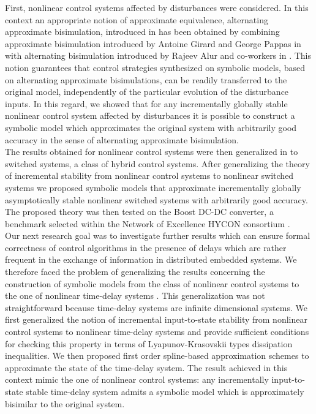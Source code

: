 \documentclass[submission,copyright,creativecommons]{eptcs}
\begin{document}
First, nonlinear control systems affected by disturbances were considered. In this context an appropriate notion of approximate equivalence, alternating approximate bisimulation, introduced in \cite{PolaSIAM2009} has been obtained by combining approximate bisimulation introduced by Antoine Girard and George Pappas in \cite{AB-TAC07} with alternating bisimulation introduced by Rajeev Alur and co-workers in \cite{Alternating}. This notion guarantees that control strategies synthesized on symbolic models, based on alternating approximate bisimulations, can be readily transferred to the original model, independently of the particular evolution of the disturbance inputs. In this regard, we showed that for any incrementally globally stable nonlinear control system affected by disturbances it is possible to construct a symbolic model which approximates the original system with arbitrarily good accuracy in the sense of alternating approximate bisimulation. \\
The results obtained for nonlinear control systems were then generalized in \cite{GirardTAC2010} to switched systems, a class of hybrid control systems. After generalizing the theory of incremental stability from nonlinear control systems to nonlinear switched systems we proposed symbolic models that approximate incrementally globally asymptotically stable nonlinear switched systems with arbitrarily good accuracy. The proposed theory was then tested on the Boost DC-DC converter, a benchmark selected within the Network of Excellence HYCON consortium \cite{Hycon}.\\
Our next research goal was to investigate further results which can ensure formal correctness of control algorithms in the presence of delays which are rather frequent in the exchange of information in distributed embedded systems. We therefore faced the problem of generalizing the results concerning the construction of symbolic models from the class of nonlinear control systems to the one of nonlinear time-delay systems \cite{PolaSCL10}. This generalization was not straightforward because time-delay systems are infinite dimensional systems. We first generalized the notion of incremental input-to-state stability from nonlinear control systems to nonlinear time-delay systems and provide sufficient conditions for checking this property  in terms of Lyapunov-Krasovskii types dissipation inequalities. We then proposed first order spline-based approximation schemes to approximate the state of the time-delay system. The result achieved in this context mimic the one of nonlinear control systems: any incrementally input-to-state stable time-delay system admits a symbolic model which is approximately bisimilar to the original system. \\
\end{document}

